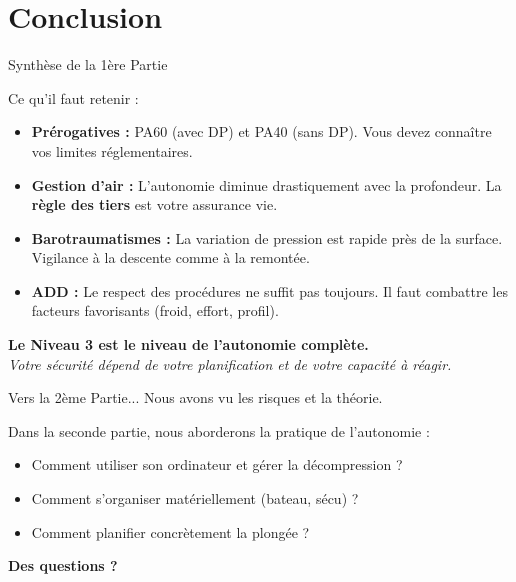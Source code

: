 \section{Conclusion}
\begin{frame}{Synthèse de la 1ère Partie}
    \begin{block}{Ce qu'il faut retenir :}
        \begin{itemize}
            \item \textbf{Prérogatives :} PA60 (avec DP) et PA40 (sans DP). Vous devez connaître vos limites réglementaires.
            \item \textbf{Gestion d'air :} L'autonomie diminue drastiquement avec la profondeur. La \textbf{règle des tiers} est votre assurance vie.
            \item \textbf{Barotraumatismes :} La variation de pression est rapide près de la surface. Vigilance à la descente comme à la remontée.
            \item \textbf{ADD :} Le respect des procédures ne suffit pas toujours. Il faut combattre les facteurs favorisants (froid, effort, profil).
        \end{itemize}
    \end{block}

    \begin{center}
        \large \textbf{Le Niveau 3 est le niveau de l'autonomie complète.} \\
        \vspace{0.5em}
        \textit{Votre sécurité dépend de votre planification et de votre capacité à réagir.}
    \end{center}
\end{frame}

\begin{frame}{Vers la 2ème Partie...}
    Nous avons vu les risques et la théorie.
    
    Dans la seconde partie, nous aborderons la pratique de l'autonomie :
    \begin{itemize}
        \item Comment utiliser son ordinateur et gérer la décompression ?
        \item Comment s'organiser matériellement (bateau, sécu) ?
        \item Comment planifier concrètement la plongée ?
    \end{itemize}
\end{frame}

\begin{frame}
    \centering
    \Huge \textbf{Des questions ?}
\end{frame}